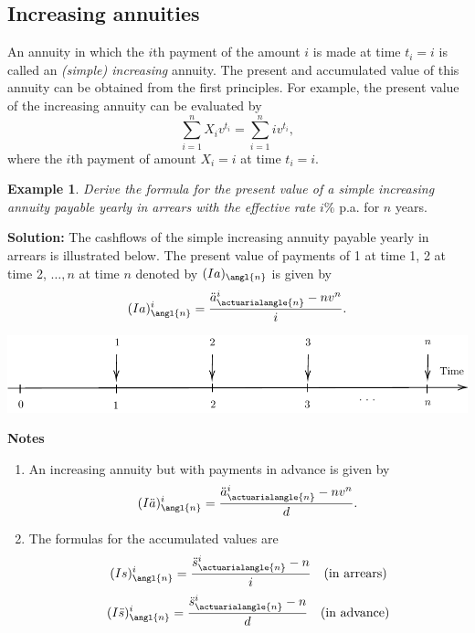 \documentclass[
]{book}
\theoremstyle{definition}
\theoremstyle{definition}
\newtheorem{example}{Example}[chapter]
\theoremstyle{definition}
\theoremstyle{definition}
\theoremstyle{remark}
\begin{document}
\subsection{Increasing annuities}\label{increasing-annuities}

An annuity in which the \(i\)th payment of the amount \(i\) is made at time
\(t_i = i\) is called an \emph{(simple) increasing} annuity. The present and
accumulated value of this annuity can be obtained from the first
principles. For example, the present value of the increasing annuity can
be evaluated by \[\sum_{i=1}^n X_i v^{t_i} = \sum_{i=1}^n i v^{t_i},\]
where the \(i\)th payment of amount \(X_i = i\) at time \(t_i = i\).

\begin{example}
\emph{Derive the formula for the present value of a simple increasing annuity
payable yearly in arrears with the effective rate} \(i\%\) p.a. for \(n\)
years.
\end{example}

\textbf{Solution:} The cashflows of the simple increasing annuity payable
yearly in arrears is illustrated below. The present value of payments of
1 at time 1, 2 at time 2, \(\ldots, n\) at time \(n\) denoted by
\((Ia)_\angl{n}\) is given by
\[(Ia)^{i}_\angl{n}   = \frac{\ddot{a}^{i}_{\actuarialangle{n}} - nv^n}{i}.\]

\begin{center}\includegraphics{SCMA266Bookdownproj_files/figure-latex/tikz-ex19-1} \end{center}

\textbf{Notes}

\begin{enumerate}
\def\labelenumi{\arabic{enumi}.}
\item
  An increasing annuity but with payments in advance is given by
  \[(I\ddot{a})^{i}_\angl{n}   = \frac{\ddot{a}^{i}_{\actuarialangle{n}} - nv^n}{d}.\]
\item
  The formulas for the accumulated values are
  \[(Is)^{i}_\angl{n} = \frac{\ddot{s}^{i}_{\actuarialangle{n}} - n}{i} \quad\text{(in arrears)}\]
  \[(I\ddot{s})^{i}_\angl{n} = \frac{\ddot{s}^{i}_{\actuarialangle{n}} - n}{d} \quad\text{(in advance)}\]
\end{enumerate}
\end{document}
